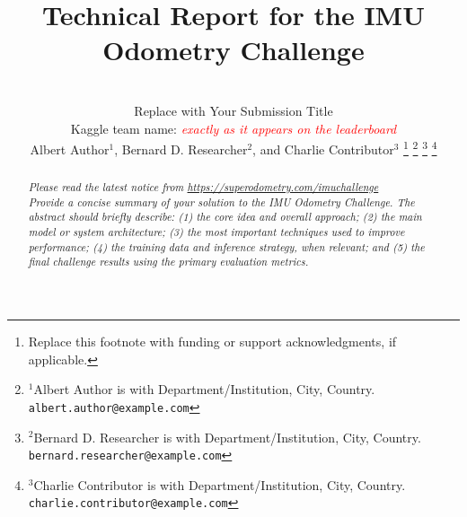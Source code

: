 \documentclass[letterpaper,10pt,conference]{ieeeconf}
\title{\LARGE \bf
Technical Report for the IMU Odometry Challenge
}
\author{\\
Replace with Your Submission Title\\
Kaggle team name: \textcolor{red}{\textit{exactly as it appears on the leaderboard}}\\
Albert Author$^{1}$, Bernard D. Researcher$^{2}$, and Charlie Contributor$^{3}$%
\thanks{Replace this footnote with funding or support acknowledgments, if applicable.}%
\thanks{$^{1}$Albert Author is with Department/Institution, City, Country.
        {\tt\small albert.author@example.com}}%
\thanks{$^{2}$Bernard D. Researcher is with Department/Institution, City, Country.
        {\tt\small bernard.researcher@example.com}}%
\thanks{$^{3}$Charlie Contributor is with Department/Institution, City, Country.
        {\tt\small charlie.contributor@example.com}}%
}
\newcommand{\instruction}[1]{\textcolor{instructionblue}{\textit{#1}}}
\begin{document}
\maketitle
\thispagestyle{empty}
\pagestyle{empty}

\begin{abstract}
\instruction{Please read the latest notice from
\url{https://superodometry.com/imuchallenge}
\\
Provide a concise summary of your solution to the IMU Odometry Challenge.
The abstract should briefly describe:
(1) the core idea and overall approach;
(2) the main model or system architecture;
(3) the most important techniques used to improve performance;
(4) the training data and inference strategy, when relevant; and
(5) the final challenge results using the primary evaluation metrics.
}

\end{abstract}
\end{document}
